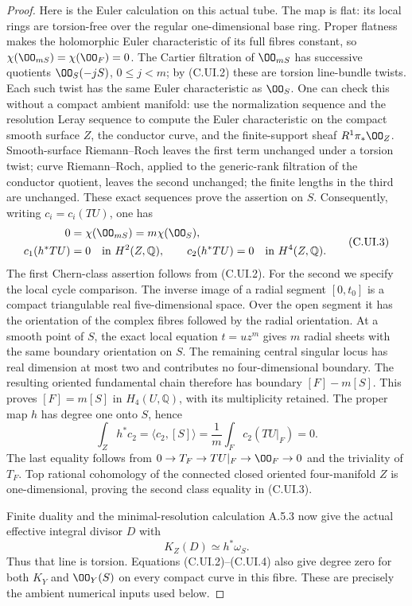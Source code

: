 \begin{proof}
Here is the Euler calculation on this actual tube.
The map is flat: its local rings are torsion-free
over the regular one-dimensional base ring.
Proper flatness makes the holomorphic Euler
characteristic of its full fibres constant, so
$\chi(\OO_{mS})=\chi(\OO_F)=0$.
The Cartier filtration of $\OO_{mS}$ has successive
quotients $\OO_S(-jS)$, $0\le j<m$; by (C.UI.2)
these are torsion line-bundle twists.
Each such twist has the same Euler characteristic
as $\OO_S$. One can check this without a compact
ambient manifold: use the normalization sequence
and the resolution Leray sequence to compute the
Euler characteristic on the compact smooth surface
$Z$, the conductor curve, and the finite-support
sheaf $R^1\pi_*\OO_Z$. Smooth-surface
Riemann--Roch leaves the first term unchanged
under a torsion twist; curve Riemann--Roch,
applied to the generic-rank filtration of the
conductor quotient, leaves the second unchanged;
the finite lengths in the third are unchanged.
These exact sequences prove the assertion on $S$.
Consequently, writing $c_i=c_i(TU)$, one has
\[
 \begin{split}
 0&=\chi(\OO_{mS})=m\chi(\OO_S),\\
 c_1(h^*TU)&=0\quad\hbox{in }H^2(Z,\mathbb Q),
 \qquad c_2(h^*TU)=0\quad\hbox{in }H^4(Z,\mathbb Q).
 \end{split}
 \tag{C.UI.3}
\]
The first Chern-class assertion follows from (C.UI.2).
For the second we specify the local cycle comparison.
The inverse image of a radial segment $[0,t_0]$
is a compact triangulable real five-dimensional
space. Over the open segment it has the orientation
of the complex fibres followed by the radial
orientation. At a smooth point of $S$, the exact
local equation $t=u z^m$ gives $m$ radial sheets
with the same boundary orientation on $S$.
The remaining central singular locus has real
dimension at most two and contributes no
four-dimensional boundary. The resulting oriented
fundamental chain therefore has boundary
$[F]-m[S]$. This proves $[F]=m[S]$ in
$H_4(U,\mathbb Q)$, with its multiplicity retained.
The proper map $h$ has degree one onto $S$, hence
\[
 \int_Z h^*c_2=\langle c_2,[S]\rangle
       =\frac1m\int_F c_2(TU|_F)=0.
\]
The last equality follows from
$0\to T_F\to TU|_F\to\OO_F\to0$ and the
triviality of $T_F$. Top rational cohomology of
the connected closed oriented four-manifold $Z$
is one-dimensional, proving the second class
equality in (C.UI.3).

Finite duality and the minimal-resolution calculation
A.5.3 now give the actual effective integral divisor $D$
with
\[
                    K_Z(D)\simeq h^*\omega_S.
 \tag{C.UI.4}
\]
Thus that line is torsion. Equations (C.UI.2)--(C.UI.4)
also give degree zero for both $K_Y$ and $\OO_Y(S)$
on every compact curve in this fibre. These are precisely
the ambient numerical inputs used below.


\end{proof}
